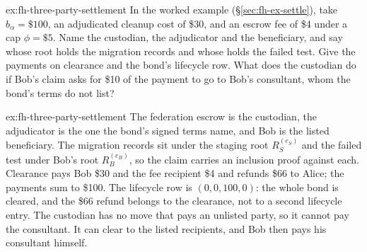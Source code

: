 \documentclass[11pt,a4paper]{article}
\theoremstyle{definition}
\theoremstyle{remark}
\begin{document}
\begin{pdexercise}[kind=Check,rating=1]{ex:fh-three-party-settlement}
In the worked example (\S\ref{sec:fh-ex-settle}), take $b_\alpha=\$100$, an adjudicated cleanup cost of \$30, and an escrow fee of \$4 under a cap $\phi=\$5$. Name the custodian, the adjudicator and the beneficiary, and say whose root holds the migration records and whose holds the failed test. Give the payments on clearance and the bond's lifecycle row. What does the custodian do if Bob's claim asks for \$10 of the payment to go to Bob's consultant, whom the bond's terms do not list?
\end{pdexercise}
\begin{pdsolution}{ex:fh-three-party-settlement}
The federation escrow is the custodian, the adjudicator is the one the bond's signed terms name, and Bob is the listed beneficiary. The migration records sit under the staging root $R_S^{(e_S)}$ and the failed test under Bob's root $R_B^{(e_B)}$, so the claim carries an inclusion proof against each. Clearance pays Bob \$30 and the fee recipient \$4 and refunds \$66 to Alice; the payments sum to \$100. The lifecycle row is $(0,0,100,0)$: the whole bond is cleared, and the \$66 refund belongs to the clearance, not to a second lifecycle entry. The custodian has no move that pays an unlisted party, so it cannot pay the consultant. It can clear to the listed recipients, and Bob then pays his consultant himself.
\end{pdsolution}

\end{document}
